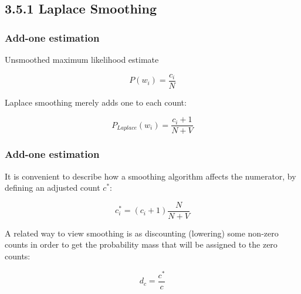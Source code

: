 \documentclass[13.5pt,aspecratio=169]{beamer}
\begin{document}
\subsection{3.5.1 Laplace Smoothing}
\begin{frame}
    \onehalfspacing
        \frametitle{Add-one estimation}
        
        {\Large Unsmoothed maximum likelihood estimate} \vspace{-2em}
        {\Large
        \begin{center} 
            \[ P(w_i) = \frac{c_i}{N} \]
        \end{center}
        }
        {\Large Laplace smoothing merely adds one to each count:} \vspace{-2em}
        {\Large
        \begin{center} 
            \[ P_{Laplace} (w_i) = \frac{c_i + 1}{N + V} \]
        \end{center}
        }
\end{frame}
    

\begin{frame}
    \onehalfspacing
        \frametitle{Add-one estimation}
        
        {\Large It is convenient to describe how a smoothing algorithm affects the numerator, by defining an adjusted count $c^*$: 
        } \vspace{-2em}
        {\Large
        \begin{center} 
            \[ c^*_i = (c_i + 1) \frac{N}{N + V} \]
        \end{center}
        }

        \begin{block}{}
            A related way to view smoothing is as discounting (lowering) some non-zero counts in order to get the probability mass that will be assigned to the zero counts: 
        \end{block} \vspace{-2em}
        {\Large
        \begin{center} 
            \[ d_c = \frac{c^*}{c} \]
        \end{center}
        }
\end{frame}

\end{document}

